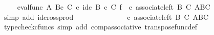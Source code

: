 \begin{isabellebody}
\ \isamarkupfalse%
\ {\isachardoublequoteopen}{\isachardot}{\kern0pt}{\isachardot}{\kern0pt}{\isachardot}{\kern0pt}\ {\isacharequal}{\kern0pt}\ {\isacharparenleft}{\kern0pt}eval{\isacharunderscore}{\kern0pt}func\ A\ {\isacharparenleft}{\kern0pt}B{\isasymtimes}\isactrlsub c\ C{\isacharparenright}{\kern0pt}{\isacharparenright}{\kern0pt}\ {\isasymcirc}\isactrlsub c\ {\isacharparenleft}{\kern0pt}{\isacharparenleft}{\kern0pt}id\isactrlsub c\ {\isacharparenleft}{\kern0pt}B\ {\isasymtimes}\isactrlsub c\ C{\isacharparenright}{\kern0pt}{\isacharparenright}{\kern0pt}\ {\isasymtimes}\isactrlsub f\ {\isasympsi}\isactrlsup {\isasymsharp}{\isacharparenright}{\kern0pt}\ {\isasymcirc}\isactrlsub c\ associate{\isacharunderscore}{\kern0pt}left\ B\ C\ {\isacharparenleft}{\kern0pt}{\isacharparenleft}{\kern0pt}A\isactrlbsup B\isactrlesup {\isacharparenright}{\kern0pt}\isactrlbsup C\isactrlesup {\isacharparenright}{\kern0pt}{\isachardoublequoteclose}\isanewline
\ \ \ \ \ \ \ \ \ \ \isamarkupfalse%
\ {\isacharparenleft}{\kern0pt}simp\ add{\isacharcolon}{\kern0pt}\ id{\isacharunderscore}{\kern0pt}cross{\isacharunderscore}{\kern0pt}prod{\isacharparenright}{\kern0pt}\isanewline
\ \ \ \ \ \ \ \ \isamarkupfalse%
\ \isamarkupfalse%
\ {\isachardoublequoteopen}{\isachardot}{\kern0pt}{\isachardot}{\kern0pt}{\isachardot}{\kern0pt}\ {\isacharequal}{\kern0pt}\ {\isasympsi}\ {\isasymcirc}\isactrlsub c\ associate{\isacharunderscore}{\kern0pt}left\ B\ C\ {\isacharparenleft}{\kern0pt}{\isacharparenleft}{\kern0pt}A\isactrlbsup B\isactrlesup {\isacharparenright}{\kern0pt}\isactrlbsup C\isactrlesup {\isacharparenright}{\kern0pt}{\isachardoublequoteclose}\isanewline
\ \ \ \ \ \ \ \ \ \ \isamarkupfalse%
\ {\isacharparenleft}{\kern0pt}typecheck{\isacharunderscore}{\kern0pt}cfuncs{\isacharcomma}{\kern0pt}\ simp\ add{\isacharcolon}{\kern0pt}\ comp{\isacharunderscore}{\kern0pt}associative{}\ transpose{\isacharunderscore}{\kern0pt}func{\isacharunderscore}{\kern0pt}def{\isacharparenright}{\kern0pt}\isanewline
\ \ \ \ \ \ \ \ \isamarkupfalse%
\ \isamarkupfalse%

\end{isabellebody}
